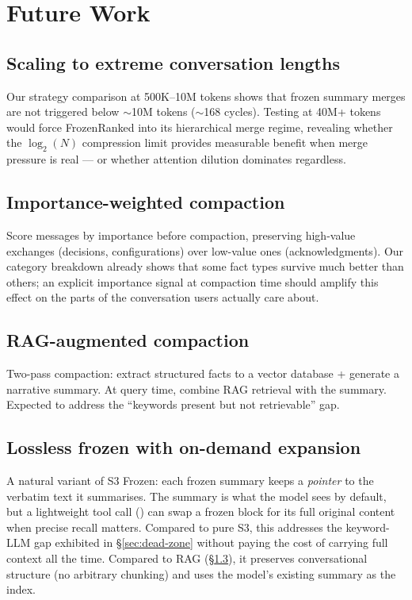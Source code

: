 \section{Future Work}
\label{sec:future}

\subsection{Scaling to extreme conversation lengths}
\label{sec:scale-future}

Our strategy comparison at 500K--10M tokens shows that frozen summary merges are not
triggered below $\sim$10M tokens ($\sim$168 cycles). Testing at 40M+ tokens would
force FrozenRanked into its hierarchical merge regime, revealing whether the
$\log_2(N)$ compression limit provides measurable benefit when merge pressure
is real --- or whether attention dilution dominates regardless.

\subsection{Importance-weighted compaction}
\label{sec:importance-weighted}

Score messages by importance before compaction, preserving high-value
exchanges (decisions, configurations) over low-value ones (acknowledgments).
Our category breakdown already shows that some fact types survive much
better than others; an explicit importance signal at compaction time should
amplify this effect on the parts of the conversation users actually care
about.

\subsection{RAG-augmented compaction}
\label{sec:rag}

Two-pass compaction: extract structured facts to a vector database + generate
a narrative summary. At query time, combine RAG retrieval with the summary.
Expected to address the ``keywords present but not retrievable'' gap.

\subsection{Lossless frozen with on-demand expansion}
\label{sec:lossless-frozen}

A natural variant of S3 Frozen: each frozen summary keeps a \textit{pointer} to the
verbatim text it summarises. The summary is what the model sees by default,
but a lightweight tool call () can swap a frozen block
for its full original content when precise recall matters. Compared to pure
S3, this addresses the keyword-LLM gap exhibited in \S\ref{sec:dead-zone} without paying the
cost of carrying full context all the time. Compared to RAG (\S\ref{sec:rag}), it
preserves conversational structure (no arbitrary chunking) and uses the
model's existing summary as the index.

